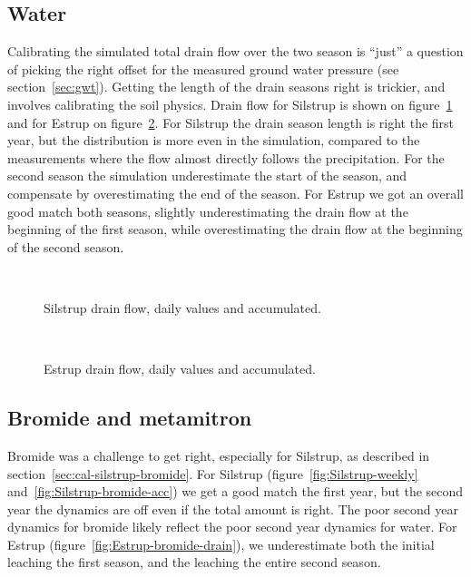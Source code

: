 \subsection{Water}

Calibrating the simulated total drain flow over the two season is
``just'' a question of picking the right offset for the measured
ground water pressure (see section~\ref{sec:gwt}).  Getting the length
of the drain seasons right is trickier, and involves calibrating the
soil physics.  Drain flow for Silstrup is shown on
figure~\ref{fig:Silstrup-drain} and for Estrup on
figure~\ref{fig:Estrup-drain}.  For Silstrup the drain season length
is right the first year, but the distribution is more even in the
simulation, compared to the measurements where the flow almost
directly follows the precipitation.  For the second season the
simulation underestimate the start of the season, and compensate by
overestimating the end of the season.  For Estrup we got an overall
good match both seasons, slightly underestimating the drain flow at the
beginning of the first season, while overestimating the drain flow at
the beginning of the second season.

\begin{figure}[htbp]
  \begin{center}
    \\
  \end{center}
  \caption{Silstrup drain flow, daily values and accumulated.}
  \label{fig:Silstrup-drain}
\end{figure}

\begin{figure}[htbp]
  \begin{center}
    \\
  \end{center}
  \caption{Estrup drain flow, daily values and accumulated.}
  \label{fig:Estrup-drain}
\end{figure}

\FloatBarrier
\subsection{Bromide and metamitron}

Bromide was a challenge to get right, especially for Silstrup, as
described in section~\ref{sec:cal-silstrup-bromide}.  For Silstrup
(figure~\ref{fig:Silstrup-weekly} and~\ref{fig:Silstrup-bromide-acc})
we get a good match the first year, but the second year the dynamics
are off even if the total amount is right.  The poor second year
dynamics for bromide likely reflect the poor second year dynamics for
water.  For Estrup (figure~\ref{fig:Estrup-bromide-drain}), we
underestimate both the initial leaching the first season, and the
leaching the entire second season.

